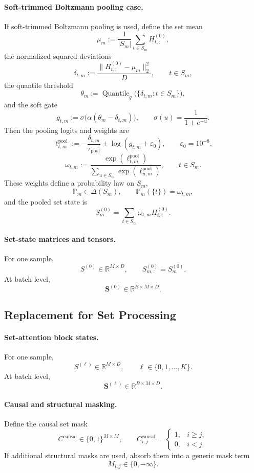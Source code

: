 \paragraph{Soft-trimmed Boltzmann pooling case.}
If soft-trimmed Boltzmann pooling is used, define the set mean
\[
\mu_m
:=
\frac{1}{|S_m|}\sum_{t\in S_m} H^{(0)}_{t,:},
\]
the normalized squared deviations
\[
\delta_{t,m}
:=
\frac{\|H^{(0)}_{t,:}-\mu_m\|_2^2}{D},
\qquad t\in S_m,
\]
the quantile threshold
\[
\theta_m := \operatorname{Quantile}_q\bigl(\{\delta_{t,m}:t\in S_m\}\bigr),
\]
and the soft gate
\[
g_{t,m}
:=
\sigma\!\bigl(\alpha(\theta_m-\delta_{t,m})\bigr),
\qquad
\sigma(u)=\frac{1}{1+e^{-u}}.
\]
Then the pooling logits and weights are
\[
\ell^{\mathrm{pool}}_{t,m}
:=
-\frac{\delta_{t,m}}{\tau_{\mathrm{pool}}}
+ \log(g_{t,m}+\varepsilon_0),
\qquad
\varepsilon_0=10^{-8},
\]
\[
\omega_{t,m}
:=
\frac{\exp(\ell^{\mathrm{pool}}_{t,m})}
{\sum_{u\in S_m}\exp(\ell^{\mathrm{pool}}_{u,m})},
\qquad t\in S_m.
\]
These weights define a probability law on \(S_m\),
\[
\mathbb P_m \in \Delta(S_m),
\qquad
\mathbb P_m(\{t\})=\omega_{t,m},
\]
and the pooled set state is
\[
S_m^{(0)}
=
\sum_{t\in S_m}\omega_{t,m}H^{(0)}_{t,:}.
\]

\paragraph{Set-state matrices and tensors.}
For one sample,
\[
S^{(0)} \in \mathbb R^{M\times D},
\qquad
S^{(0)}_{m,:}=S_m^{(0)}.
\]
At batch level,
\[
\mathbf S^{(0)} \in \mathbb R^{B\times M\times D}.
\]

\subsection*{Replacement for Set Processing}

\paragraph{Set-attention block states.}
For one sample,
\[
S^{(\ell)}\in\mathbb R^{M\times D},
\qquad
\ell\in\{0,1,\dots,K\}.
\]
At batch level,
\[
\mathbf S^{(\ell)}\in\mathbb R^{B\times M\times D}.
\]

\paragraph{Causal and structural masking.}
Define the causal set mask
\[
C^{\mathrm{causal}}\in\{0,1\}^{M\times M},
\qquad
C^{\mathrm{causal}}_{i,j}=
\begin{cases}
1,& i\ge j,\\
0,& i<j.
\end{cases}
\]
If additional structural masks are used, absorb them into a generic mask term
\[
M_{i,j}\in\{0,-\infty\}.
\]

